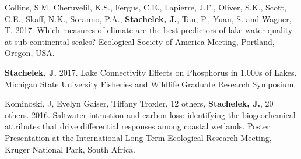 \documentclass[11pt]{article}
\begin{document}
\begin{bibenum}

  \item Collins, S.M, Cheruvelil, K.S., Fergus, C.E., Lapierre, J.F., Oliver, S.K., Scott, C.E., Skaff, N.K., Soranno, P.A., \textbf{Stachelek, J.}, Tan, P., Yuan, S. and Wagner, T. 2017. Which measures of climate are the best predictors of lake water quality at sub-continental scales? Ecological Society of America Meeting, Portland, Oregon, USA.

  \item \textbf{Stachelek, J.} 2017. Lake Connectivity Effects on Phosphorus in 1,000s of Lakes. Michigan State University Fisheries and Wildlife Graduate Research Symposium.

  \item Kominoski, J, Evelyn Gaiser, Tiffany Troxler, 12 others, \textbf{Stachelek, J.}, 20 others. 2016. Saltwater intrustion and carbon loss: identifying the biogeochemical attributes that drive differential responses among coastal wetlands. Poster Presentation at the International Long Term Ecological Research Meeting, Kruger National Park, South Africa.


\end{bibenum}
\end{document}
